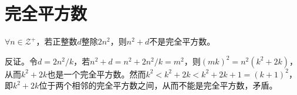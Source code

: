 
\chapter{完全平方数}
\label{chap:perfect-squares}

\begin{example}[1953 \kurschak]
  $\forall n\in\mathcal{Z}^+$，若正整数$d$整除$2n^2$，则$n^2+d$不是完全平方数。
\end{example}

\hints 反证。令$d=2n^2/k$，若$n^2+d=n^2+2n^2/k=m^2$，则$(mk)^2=n^2(k^2+2k)$，从而$k^2+2k$也是一个完全平方数。然而$k^2<k^2+2k<k^2+2k+1=(k+1)^2$，即$k^2+2k$位于两个相邻的完全平方数之间，从而不能是完全平方数，矛盾。